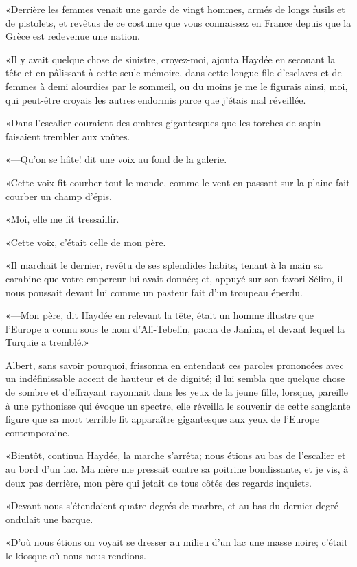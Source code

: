 «Derrière les femmes venait une garde de vingt hommes, armés de longs fusils et de pistolets, et revêtus de ce costume que vous connaissez en France depuis que la Grèce est redevenue une nation. 

«Il y avait quelque chose de sinistre, croyez-moi, ajouta Haydée en secouant la tête et en pâlissant à cette seule mémoire, dans cette longue file d'esclaves et de femmes à demi alourdies par le sommeil, ou du moins je me le figurais ainsi, moi, qui peut-être croyais les autres endormis parce que j'étais mal réveillée. 

«Dans l'escalier couraient des ombres gigantesques que les torches de sapin faisaient trembler aux voûtes. 

«—Qu'on se hâte! dit une voix au fond de la galerie. 

«Cette voix fit courber tout le monde, comme le vent en passant sur la plaine fait courber un champ d'épis. 

«Moi, elle me fit tressaillir. 

«Cette voix, c'était celle de mon père. 

«Il marchait le dernier, revêtu de ses splendides habits, tenant à la main sa carabine que votre empereur lui avait donnée; et, appuyé sur son favori Sélim, il nous poussait devant lui comme un pasteur fait d'un troupeau éperdu. 

«—Mon père, dit Haydée en relevant la tête, était un homme illustre que l'Europe a connu sous le nom d'Ali-Tebelin, pacha de Janina, et devant lequel la Turquie a tremblé.» 

Albert, sans savoir pourquoi, frissonna en entendant ces paroles prononcées avec un indéfinissable accent de hauteur et de dignité; il lui sembla que quelque chose de sombre et d'effrayant rayonnait dans les yeux de la jeune fille, lorsque, pareille à une pythonisse qui évoque un spectre, elle réveilla le souvenir de cette sanglante figure que sa mort terrible fit apparaître gigantesque aux yeux de l'Europe contemporaine. 

«Bientôt, continua Haydée, la marche s'arrêta; nous étions au bas de l'escalier et au bord d'un lac. Ma mère me pressait contre sa poitrine bondissante, et je vis, à deux pas derrière, mon père qui jetait de tous côtés des regards inquiets. 

«Devant nous s'étendaient quatre degrés de marbre, et au bas du dernier degré ondulait une barque. 

«D'où nous étions on voyait se dresser au milieu d'un lac une masse noire; c'était le kiosque où nous nous rendions. 

